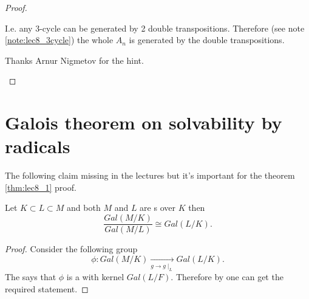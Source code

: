 \begin{theorem}[$S_n$ solvability]
\begin{proof}
\begin{enumerate}
{          I.e. any 3-cycle can be generated by 2 double
          transpositions. Therefore (see note \ref{note:lec8_3cycle})
          the whole $A_n$ is generated by 
          the double transpositions.

          Thanks Arnur Nigmetov for the hint.
        }
    \end{enumerate}
  \end{proof}
  \label{thm:lec8_sn_solvability}
\end{theorem}

\section{Galois theorem on solvability by radicals}

The following claim missing in the lectures but it's important for the
theorem \ref{thm:lec8_1} proof.
\begin{claim}
  Let $K \subset L \subset M$ and both $M$ and $L$ are
  s over $K$ then
  \[
  \frac{Gal\left(M/K\right)}{Gal\left(M/L\right)}
  \cong Gal\left(L/K\right).
  \]
  \begin{proof}
    Consider the following group 
    \[
    \phi:Gal\left(M/K\right) \xrightarrow[g \to g\mid_L]{} Gal\left(L/K\right).
    \]
    The  says that $\phi$ is
    a  with kernel
    $Gal\left(L/F\right)$. Therefore by
     one can get the required
    statement. 
  \end{proof}
  \label{claim:galoisquotient}
\end{claim}

